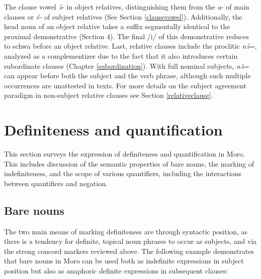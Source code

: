 The clause vowel \textit{ə́-} in object relatives, distinguishing them from the \textit{a-} of main clauses or \textit{é-} of subject relatives (See Section \ref{clausevowel}). Additionally, the head noun of an object relative takes a suffix segmentally identical to the proximal demonstrative (Section 4). The final /i/ of this demonstrative reduces to schwa before an object relative. Last, relative clauses include the proclitic \textit{nə́=}, analyzed as a complementizer due to the fact that it also introduces certain subordinate clauses (Chapter \ref{subordination}). With full nominal subjects, \textit{nə́=} can appear before both the subject and the verb phrase, although such multiple occurrences are unattested in texts. For more details on the subject agreement paradigm in non-subject relative clauses see Section \ref{relativeclause}. 




\section{Definiteness and quantification}%

This section surveys the expression of definiteness and quantification in Moro. This includes discussion of the semantic properties of bare nouns, the marking of indefiniteness, and the scope of various quantifiers, including the interactions between quantifiers and negation.

\subsection{Bare nouns}\label{section:baren}

The two main means of marking definiteness are through syntactic position, as there is a tendency for definite, topical noun phrases to occur as subjects, and via the strong concord markers reviewed above. The following example demonstrates that bare nouns in Moro can be used both as indefinite expressions in subject position but also as anaphoric definite expressions in subsequent clauses:

